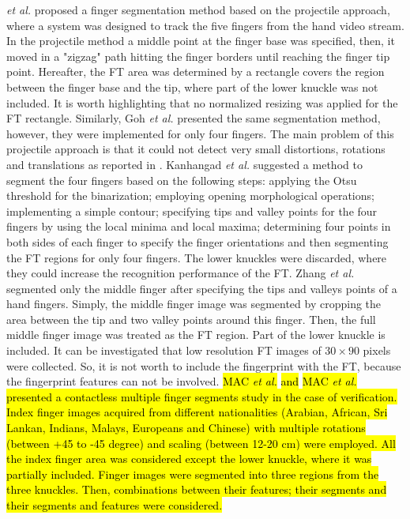 \documentclass[review]{elsarticle}
\begin{document}
	\textit{et al.} \cite{Michael2010Robust} proposed a finger segmentation method based on the projectile approach, where a system was designed to track the five fingers from the hand video stream. In the projectile method a middle point at the finger base was specified, then, it moved in a "zigzag" path hitting the finger borders until reaching the finger tip point. Hereafter, the FT area was determined by a rectangle covers the region between the finger base and the tip, where part of the lower knuckle was not included. It is worth highlighting that no normalized resizing was applied for the FT rectangle. Similarly, Goh \textit{et al.} \cite{michael2010innovative,Goh2010Bi-modal} presented the same segmentation method, however, they were implemented for only four fingers. The main problem of this projectile approach is that it could not detect very small distortions, rotations and translations as reported in \cite{Goh2010Bi-modal}. Kanhangad \textit{et al.} \cite{Kanhangad2011AUnified} suggested a method to segment the four fingers based on the following steps: applying the Otsu threshold \cite{otsu1975threshold} for the binarization; employing opening morphological operations; implementing a simple contour; specifying tips and valley points for the four fingers by using the local minima and local maxima; determining four points in both sides of each finger to specify the finger orientations and then segmenting the FT regions for only four fingers. The lower knuckles were discarded, where they could increase the recognition performance of the FT. Zhang \textit{et al.} \cite{zhang2012hand} segmented only the middle finger after specifying the tips and valleys points of a hand fingers. Simply, the middle finger image was segmented by cropping the area between the tip and two valley points around this finger. Then, the full middle finger image was treated as the FT region. Part of the lower knuckle is included. It can be investigated that low resolution FT images of $30 \times 90$ pixels were collected. So, it is not worth to include the fingerprint with the FT, because the fingerprint features can not be involved. \hl{MAC \textit{et al.}} \cite{MAC2018contactless} \hl{and} \hl{MAC \textit{et al.}} \cite{Jahan2018Contactless} \hl{presented a contactless multiple finger segments study in the case of verification. Index finger images acquired from different nationalities (Arabian, African, Sri Lankan, Indians, Malays, Europeans and Chinese) with multiple rotations (between +45 to -45 degree) and scaling (between 12-20 cm) were employed. All the index finger area was considered except the lower knuckle, where it was partially included. Finger images were segmented into three regions from the three knuckles. Then, combinations between their features; their segments and their segments and features were considered.}
\end{document}
